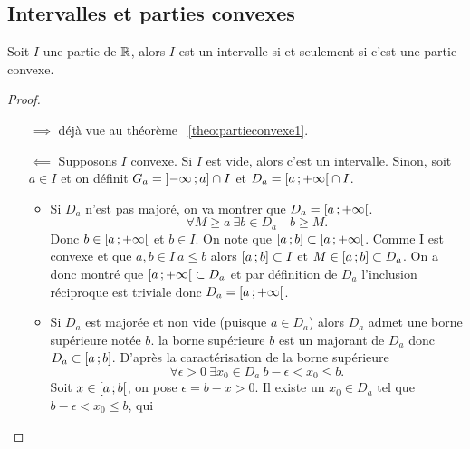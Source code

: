 \subsection{Intervalles et parties convexes}

\begin{theo}
  Soit \(I\) une partie de \(\mathbb{R}\), alors \(I\) est un intervalle si et seulement 
  si c'est une partie convexe.
\end{theo}
\begin{proof}
  \begin{itemize}
    \item[\(\implies\)] déjà vue au théorème~
      \ref{theo:partieconvexe1}.
    \item[\(\impliedby\)] Supposons \(I\) convexe. Si \(I\) est vide, alors 
      c'est un intervalle. Sinon, soit \(a\in I\) et on définit \(G_a = 
      \left]  - \infty \, ;  a \right]\cap I\) et \(D_a = \left[ a \, ;   + 
      \infty \right[\cap I\).
      \begin{itemize}
        \item Si \(D_a\) n'est pas majoré, on va montrer que \(D_a = 
          \left[ a \, ;   + \infty \right[\).
          \begin{equation}
            \forall M \geqslant a \ \exists b \in D_a \quad b\geqslant M.
          \end{equation}
          Donc \(b\in \left[ a \, ;   + \infty \right[\) et \(b\in I\). On note que 
          \(\left[ a \, ;  b \right]\subset \left[ a \, ;   + \infty \right[\). Comme I 
          est convexe et que \(a, b \in I \ a \leqslant b\) alors 
          \(\left[ a \, ;  b \right]\subset I\) et \(M\in \left[ a \, ;  b \right] \subset 
          D_a\). On a donc montré que \(\left[ a \, ;   + \infty \right[ \subset 
          D_a\) et par définition de \(D_a\) l'inclusion réciproque est triviale 
          donc \(D_a = \left[ a \, ;   + \infty \right[\).
        \item Si \(D_a\) est majorée et non vide (puisque \(a\in D_a\)) alors 
          \(D_a\) admet une borne supérieure notée \(b\). la borne supérieure 
          \(b\) est un majorant de \(D_a\) donc \(D_a \subset 
          \left[ a \, ;  b \right]\). D'après la caractérisation de la borne 
          supérieure
          \begin{equation}
            \forall \epsilon >0 \ \exists x_0 \in D_a \ b - \epsilon < 
            x_0\leqslant b.
          \end{equation}
          Soit \(x\in \left[ a \, ;  b \right[\), on pose \(\epsilon = b - x>0\). Il 
          existe un \(x_0\in D_a\) tel que \(b - \epsilon<x_0 \leqslant b\), qui 

\end{itemize}
\end{itemize}
\end{proof}
